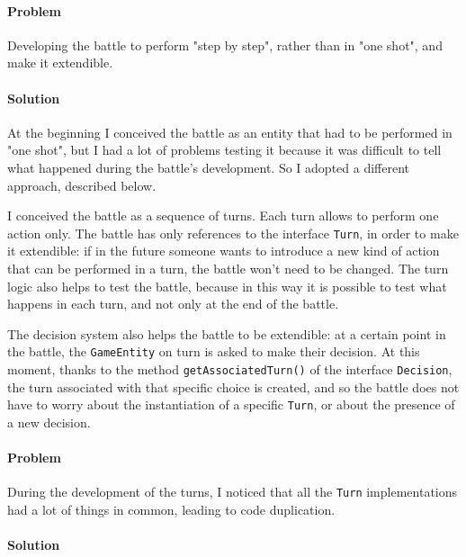 \documentclass[12pt, a4paper]{report}
\theoremstyle{definition}
\begin{document}
            \paragraph{Problem} 

            Developing the battle to perform "step by step", rather than in "one shot", and make it extendible.

            \paragraph{Solution}

            At the beginning I conceived the battle as an entity that had to be performed in "one shot", but I had a lot of problems 
            testing it because it was difficult to tell what happened during the battle's development. So I adopted a different
            approach, described below.

            I conceived the battle as a sequence of turns. Each turn allows to perform one action only. The battle has only
            references to the interface \verb|Turn|, in order to make it extendible: if in the future someone wants to introduce
            a new kind of action that can be performed in a turn, the battle won't need to be changed.
            The turn logic also helps to test the battle, because in this way it is possible to test what happens in each turn,
            and not only at the end of the battle.

            The decision system also helps the battle to be extendible: at a certain point in the battle, the \verb|GameEntity| on turn is asked
            to make their decision. At this moment, thanks to the method \verb|getAssociatedTurn()| of the interface \verb|Decision|,
            the turn associated with that specific choice is created, and so the battle does not have to worry about the instantiation of a
            specific \verb|Turn|, or about the presence of a new decision.

            \paragraph{Problem}

            During the development of the turns, I noticed that all the \verb|Turn| implementations had a lot of things in
            common, leading to code duplication.

            \paragraph{Solution}
\end{document}

